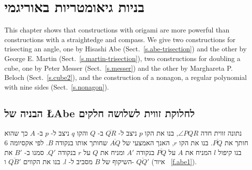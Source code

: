 

\chapter{בניות גיאומטריות באוריגמי}\label{c.origami-constructions}

This chapter shows that constructions with origami are more powerful than constructions with a straightedge  and compass. We give two constructions for trisecting an angle, one by Hisashi Abe (Sect.~\ref{s.abe-trisection}) and the other by  George E. Martin (Sect.~\ref{s.martin-trisection}), two constructions for doubling a cube, one by Peter Messer (Sect.~\ref{s.messer}) and the other by Marghareta P. Beloch (Sect.~\ref{s.cube2}), and the construction of a nonagon, a regular polynomial with nine sides (Sect.~\ref{s.nonagon}).

\section{הבניה של 
\L{Abe}\label{s.abe-trisection}
לחלוקת זווית לשלושה חלקים%
}\label{s.trisection-abe}

נתונה זווית חדה
$\angle PQR$,
בנו את הקו
$p$
ניצב ל-%
$\overline{QR}$
ב-%
$Q$
והקו
$q$
ניצב ל-%
$p$
ב-%
$A$
כך שהוא חותך את
$\overline{PQ}$.
בנו את הקו
$r$,
האנך האמצעי של
$\overline{AQ}$
שחותך אותו בנקודה
$B$.
לפי אקסיומה 
$6$
בנו קיפול
$l$
המניח את 
$A$
על
$\overline{PQ}$ 
בנקודה
$A'$
ומניח את
$Q$
על
$r$
בנקודה
$Q'$.
סמנו ב-%
$B'$
את השיקוף של 
$B$
מסביב ל-%
$l$.
בנו את הקווים
$\overline{QB'}$
ו-%
$\overline{QQ'}$
(איור%
~\ref{f.abe1}).

